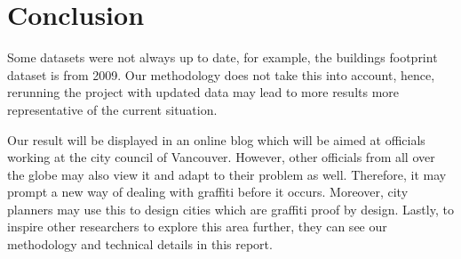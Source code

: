 \chapter{Conclusion}




Some datasets were not always up to date, for example, the buildings footprint dataset is from 2009. Our methodology does not take this into account, hence, rerunning the project with updated data may lead to more results more representative of the current situation.

Our result will be displayed in an online blog which will be aimed at officials working at the city council of Vancouver.
However, other officials from all over the globe may also view it and adapt to their problem as well.
Therefore, it may prompt a new way of dealing with graffiti before it occurs.
Moreover, city planners may use this to design cities which are graffiti proof by design.
Lastly, to inspire other researchers to explore this area further, they can see our methodology and technical details in this report.